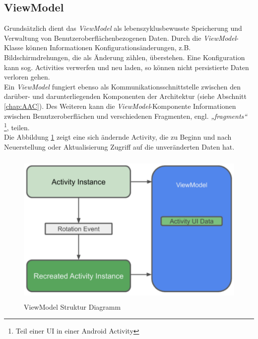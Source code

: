 \subsection*{ViewModel}
\label{sec:ViewModel}
Grundsätzlich dient das \textit{ViewModel} als lebenszyklusbewusste Speicherung und Verwaltung von Benutzeroberflächenbezogenen Daten. 
Durch die \textit{ViewModel}-Klasse können Informationen Konfigurationsänderungen, z.B. Bildschirmdrehungen, die als Änderung zählen, 
überstehen. Eine Konfiguration kann sog. Activities verwerfen und neu laden, so können nicht persistierte Daten verloren gehen. 
\\ 
\linebreak
Ein \textit{ViewModel} fungiert ebenso als Kommunikationsschnittstelle zwischen den darüber- und darunterliegenden Komponenten der 
Architektur (siehe Abschnitt \ref{chap:AAC}). Des Weiteren kann die \textit{ViewModel}-Komponente Informationen zwischen Benutzeroberflächen 
und verschiedenen Fragmenten, engl. \textit{„fragments“} \footnote{Teil einer \ac{UI} in einer Android Activity}, teilen.
\\ 
\linebreak
Die Abbildung \ref{pic:viewModeldiagramm} zeigt eine sich ändernde Activity, die zu Beginn und nach Neuerstellung oder Aktualisierung Zugriff 
auf die unveränderten Daten hat. 
\begin{figure}[hbt!]
    \centering
    \includegraphics[width=15cm,height=7.5cm,keepaspectratio]{2Grundlagen/Bilder/viewModelDiagram.png}
    \caption{ViewModel Struktur Diagramm \cite{viewmodeldiagr.2020}}
    \label{pic:viewModeldiagramm}
\end{figure} 

